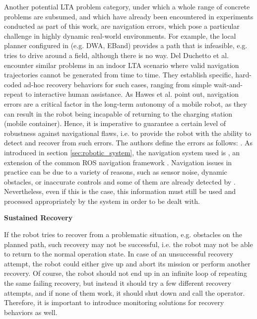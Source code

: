 \documentclass[english, master, utf8]{base/thesis_KBS}
\newcommand{\code}{\collectverb{\codebox}}
\begin{document}
\noindent
Another potential LTA problem category, under which a whole range of concrete problems are subsumed, and which have already been encountered in experiments conducted as part of
this work, are navigation errors, which pose a particular challenge in highly dynamic real-world environments. \cite{DelDuchetto:2018}
For example, the local planner configured in \code{move_base_flex} (e.g. DWA, EBand) provides a path that
is infeasible, e.g. tries to drive around a field,  although there is no way. Del Duchetto et al. encounter similar problems in an indoor LTA scenario where valid navigation
trajectories cannot be generated from time to time.
They establish specific, hard-coded ad-hoc recovery behaviors for such cases, ranging from simple wait-and-repeat to interactive human assistance. \cite{DelDuchetto:2018} As Hawes
et al. \cite{Hawes:2017} point out, navigation errors are a critical factor in the long-term autonomy of a mobile robot, as they can result in the robot being incapable of returning
to the charging station (mobile container). Hence, it is imperative to guarantee a certain level of robustness against navigational flaws, i.e. to provide the robot with the
ability to detect and recover from such errors. \cite{DelDuchetto:2018}
The authors define the errors as follows: . \cite{DelDuchetto:2018}
As introduced in section \ref{sec:robotic_system}, the navigation system used is \code{move_base_flex}, an extension of the common ROS navigation framework \code{move_base}.
Navigation issues in practice can be due to a variety of reasons, such as sensor noise, dynamic obstacles, or inaccurate controls \cite{DelDuchetto:2018} and some of them are already
detected by \code{move_base_flex}. Nevertheless, even if this is the case, this information must still be used and processed appropriately by the system in order to be dealt with.\newline

\noindent
\textbf{Sustained Recovery}\newline

\noindent
If the robot tries to recover from a problematic situation, e.g. obstacles on the planned path, such recovery may not be successful, i.e. the robot may not be able
to return to the normal operation state. In case of an unsuccessful recovery attempt, the robot could either give up and abort its mission or perform another recovery.
Of course, the robot should not end up in an infinite loop of repeating the same failing recovery, but instead it should try a few different recovery attempts,
and if none of them work, it should shut down and call the operator. Therefore, it is important to introduce monitoring solutions for recovery behaviors as well.\newline
\end{document}
